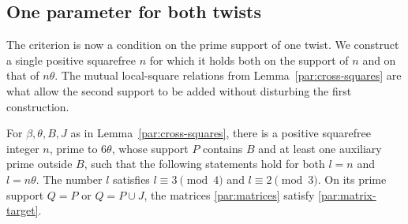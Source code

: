 \subsection{One parameter for both twists}

The criterion is now a condition on the prime support of one twist.
We construct a single positive squarefree $n$ for which it holds both
on the support of $n$ and on that of $n\theta$. The mutual local-square
relations from Lemma~\ref{par:cross-squares} are what allow the second
support to be added without disturbing the first construction.

\begin{lemma}\label{par:simultaneous-matrices}
For $\beta,\theta,B,J$ as in Lemma~\ref{par:cross-squares}, there is
a positive squarefree integer $n$, prime to $6\theta$, whose support
$P$ contains $B$ and at least one auxiliary prime outside $B$, such
that the following statements hold for both $l=n$ and $l=n\theta$.
The number $l$ satisfies $l\equiv3\pmod4$ and $l\equiv2\pmod3$.
On its prime support $Q=P$ or $Q=P\cup J$, the matrices
\eqref{par:matrices} satisfy \eqref{par:matrix-target}.
\end{lemma}

